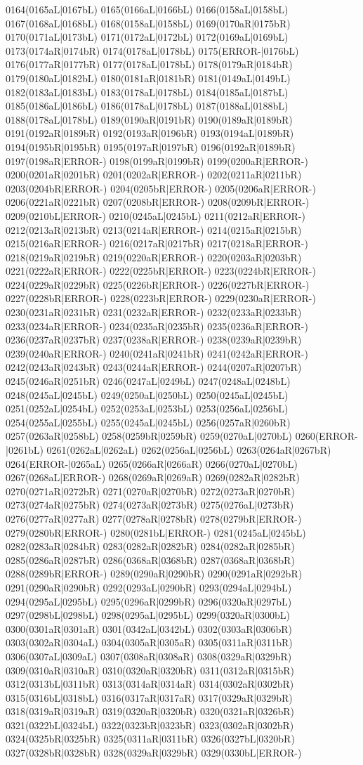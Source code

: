 0164(0165aL|0167bL) 0165(0166aL|0166bL) 0166(0158aL|0158bL) 0167(0168aL|0168bL) 0168(0158aL|0158bL) 0169(0170aR|0175bR) 0170(0171aL|0173bL) 0171(0172aL|0172bL) 0172(0169aL|0169bL) 0173(0174aR|0174bR) 0174(0178aL|0178bL) 0175(ERROR-|0176bL) 0176(0177aR|0177bR) 0177(0178aL|0178bL) 0178(0179aR|0184bR) 0179(0180aL|0182bL) 0180(0181aR|0181bR) 0181(0149aL|0149bL) 0182(0183aL|0183bL) 0183(0178aL|0178bL) 0184(0185aL|0187bL) 0185(0186aL|0186bL) 0186(0178aL|0178bL) 0187(0188aL|0188bL) 0188(0178aL|0178bL) 0189(0190aR|0191bR) 0190(0189aR|0189bR) 0191(0192aR|0189bR) 0192(0193aR|0196bR) 0193(0194aL|0189bR) 0194(0195bR|0195bR) 0195(0197aR|0197bR) 0196(0192aR|0189bR) 0197(0198aR|ERROR-) 0198(0199aR|0199bR) 0199(0200aR|ERROR-) 0200(0201aR|0201bR) 0201(0202aR|ERROR-) 0202(0211aR|0211bR) 0203(0204bR|ERROR-) 0204(0205bR|ERROR-) 0205(0206aR|ERROR-) 0206(0221aR|0221bR) 0207(0208bR|ERROR-) 0208(0209bR|ERROR-) 0209(0210bL|ERROR-) 0210(0245aL|0245bL) 0211(0212aR|ERROR-) 0212(0213aR|0213bR) 0213(0214aR|ERROR-) 0214(0215aR|0215bR) 0215(0216aR|ERROR-) 0216(0217aR|0217bR) 0217(0218aR|ERROR-) 0218(0219aR|0219bR) 0219(0220aR|ERROR-) 0220(0203aR|0203bR) 0221(0222aR|ERROR-) 0222(0225bR|ERROR-) 0223(0224bR|ERROR-) 0224(0229aR|0229bR) 0225(0226bR|ERROR-) 0226(0227bR|ERROR-) 0227(0228bR|ERROR-) 0228(0223bR|ERROR-) 0229(0230aR|ERROR-) 0230(0231aR|0231bR) 0231(0232aR|ERROR-) 0232(0233aR|0233bR) 0233(0234aR|ERROR-) 0234(0235aR|0235bR) 0235(0236aR|ERROR-) 0236(0237aR|0237bR) 0237(0238aR|ERROR-) 0238(0239aR|0239bR) 0239(0240aR|ERROR-) 0240(0241aR|0241bR) 0241(0242aR|ERROR-) 0242(0243aR|0243bR) 0243(0244aR|ERROR-) 0244(0207aR|0207bR) 0245(0246aR|0251bR) 0246(0247aL|0249bL) 0247(0248aL|0248bL) 0248(0245aL|0245bL) 0249(0250aL|0250bL) 0250(0245aL|0245bL) 0251(0252aL|0254bL) 0252(0253aL|0253bL) 0253(0256aL|0256bL) 0254(0255aL|0255bL) 0255(0245aL|0245bL) 0256(0257aR|0260bR) 0257(0263aR|0258bL) 0258(0259bR|0259bR) 0259(0270aL|0270bL) 0260(ERROR-|0261bL) 0261(0262aL|0262aL) 0262(0256aL|0256bL) 0263(0264aR|0267bR) 0264(ERROR-|0265aL) 0265(0266aR|0266aR) 0266(0270aL|0270bL) 0267(0268aL|ERROR-) 0268(0269aR|0269aR) 0269(0282aR|0282bR) 0270(0271aR|0272bR) 0271(0270aR|0270bR) 0272(0273aR|0270bR) 0273(0274aR|0275bR) 0274(0273aR|0273bR) 0275(0276aL|0273bR) 0276(0277aR|0277aR) 0277(0278aR|0278bR) 0278(0279bR|ERROR-) 0279(0280bR|ERROR-) 0280(0281bL|ERROR-) 0281(0245aL|0245bL) 0282(0283aR|0284bR) 0283(0282aR|0282bR) 0284(0282aR|0285bR) 0285(0286aR|0287bR) 0286(0368aR|0368bR) 0287(0368aR|0368bR) 0288(0289bR|ERROR-) 0289(0290aR|0290bR) 0290(0291aR|0292bR) 0291(0290aR|0290bR) 0292(0293aL|0290bR) 0293(0294aL|0294bL) 0294(0295aL|0295bL) 0295(0296aR|0299bR) 0296(0320aR|0297bL) 0297(0298bL|0298bL) 0298(0295aL|0295bL) 0299(0320aR|0300bL) 0300(0301aR|0301aR) 0301(0342aL|0342bL) 0302(0303aR|0306bR) 0303(0302aR|0304aL) 0304(0305aR|0305aR) 0305(0311aR|0311bR) 0306(0307aL|0309aL) 0307(0308aR|0308aR) 0308(0329aR|0329bR) 0309(0310aR|0310aR) 0310(0320aR|0320bR) 0311(0312aR|0315bR) 0312(0313bL|0311bR) 0313(0314aR|0314aR) 0314(0302aR|0302bR) 0315(0316bL|0318bL) 0316(0317aR|0317aR) 0317(0329aR|0329bR) 0318(0319aR|0319aR) 0319(0320aR|0320bR) 0320(0321aR|0326bR) 0321(0322bL|0324bL) 0322(0323bR|0323bR) 0323(0302aR|0302bR) 0324(0325bR|0325bR) 0325(0311aR|0311bR) 0326(0327bL|0320bR) 0327(0328bR|0328bR) 0328(0329aR|0329bR) 0329(0330bL|ERROR-) 